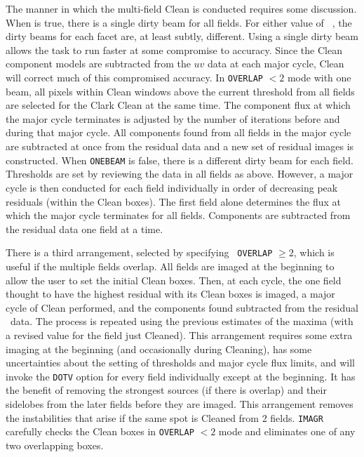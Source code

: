      The manner in which the multi-field Clean is conducted requires
some discussion.  When {\tt {}} is true, there is a
single dirty beam for all fields.  For either value of {\tt
{}}, the dirty beams for each facet are, at least subtly,
different.  Using a single dirty beam allows the task to run faster at
some compromise to accuracy.  Since the Clean component models are
subtracted from the $uv$ data at each major cycle, Clean will correct
much of this compromised accuracy.  In {\tt OVERLAP} $< 2$ mode with
one beam, all pixels within Clean windows above the current threshold
from all fields are selected for the Clark Clean at the same time.
The component flux at which the major cycle terminates is adjusted by
the number of iterations before and during that major cycle.  All
components found from all fields in the major cycle are subtracted at
once from the residual data and a new set of residual images is
constructed.  When {\tt ONEBEAM} is false, there is a different dirty
beam for each field.  Thresholds are set by reviewing the data in all
fields as above.  However, a major cycle is then conducted for each
field individually in order of decreasing peak residuals (within the
Clean boxes).  The first field alone determines the flux at which the
major cycle terminates for all fields.   Components are subtracted
from the residual data one field at a time.

     There is a third arrangement, selected by specifying {\tt
OVERLAP} $\ge 2$\@, which is useful if the multiple fields overlap.
All fields are imaged at the beginning to allow the user to set the
initial Clean boxes.  Then, at each cycle, the one field thought to
have the highest residual with its Clean boxes is imaged, a major
cycle of Clean performed, and the components found subtracted from the
residual \uv\ data.  The process is repeated using the previous
estimates of the maxima (with a revised value for the field just
Cleaned).  This arrangement requires some extra imaging at the
beginning (and occasionally during Cleaning), has some uncertainties
about the setting of thresholds and major cycle flux limits, and will
invoke the {\tt DOTV} option for every field individually except at
the beginning.  It has the benefit of removing the strongest sources
(if there is overlap) and their sidelobes from the later fields before
they are imaged.  This arrangement removes the instabilities that
arise if the same spot is Cleaned from 2 fields.  {\tt IMAGR}
carefully checks the Clean boxes in {\tt OVERLAP} $<2$ mode and
eliminates one of any two overlapping boxes.

